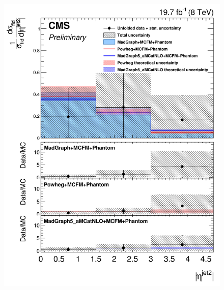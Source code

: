 \begin{figure}[hbtp]
\begin{center}
    \includegraphics[width=\cmsFigWidth]{Figures/DiffCrossSecZZTo4eEtaJet2_Unfolded_fr_MadGraph_norm.png}     

\end{center}
\end{figure}
